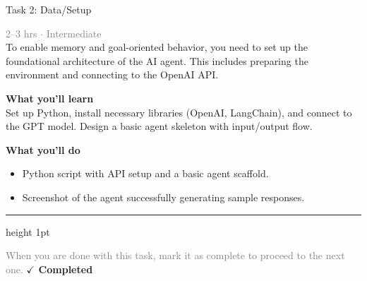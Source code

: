 \documentclass[10pt,a4paper]{article}
\begin{document}
\begin{taskbox}{Task 2: Data/Setup}

    {\small \textcolor{gray}{2--3 hrs $\cdot$ Intermediate}}\\[12pt]

      
To enable memory and goal-oriented behavior, you need to set up the foundational architecture of the AI agent. This includes preparing the environment and connecting to the OpenAI API.


\vspace{8pt}
{\large \textbf{\textcolor{brandLight}{What you'll learn}}}\\[4pt]  
Set up Python, install necessary libraries (OpenAI, LangChain), and connect to the GPT model. Design a basic agent skeleton with input/output flow.

\vspace{8pt}
{\large \textbf{\textcolor{brandLight}{What you'll do}}}\\[4pt]  
\begin{itemize}
    \item Python script with API setup and a basic agent scaffold.  
    \item Screenshot of the agent successfully generating sample responses.\par
\end{itemize}

    \vspace{16pt}

    \textcolor{cardBorder}{\hrule height 1pt}\vspace{8pt}

    \small \textcolor{gray}{When you are done with this task, mark it as complete to proceed to the next one.} \hfill \textbf{\textcolor{brandDark}{$\checkmark$ Completed}}

\end{taskbox}
\end{document}

